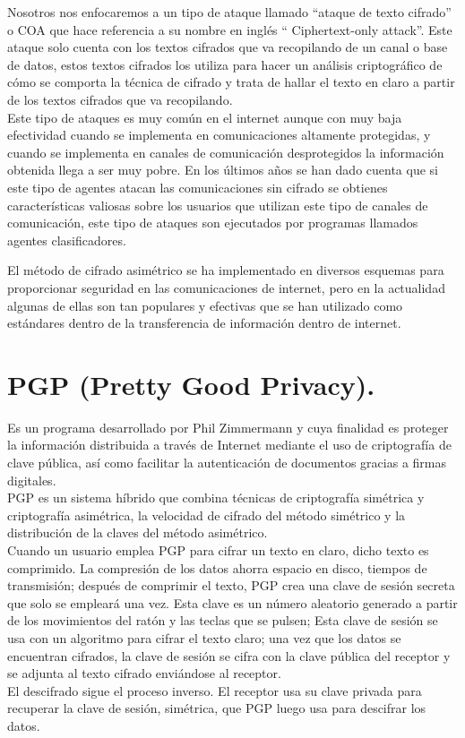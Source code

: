 \documentclass[12pt,oneside,onecolumn,openany]{report}
\begin{document}
Nosotros  nos  enfocaremos  a  un  tipo  de  ataque  llamado “ataque  de  texto  cifrado” o COA  que  hace  referencia  a  su  nombre  en  inglés “
Ciphertext-only  attack”\cite{Ciphertextonly}.  Este ataque  solo  cuenta  con  los  textos  cifrados  que  va  recopilando  de  un  canal  o  base  de 
datos,  estos  textos  cifrados  los  utiliza  para  hacer  un  análisis  criptográfico  de  cómo  se comporta la técnica de cifrado  y trata de hallar el texto en claro a partir de los textos cifrados que va recopilando. 
\\
Este  tipo  de  ataques  es  muy  común  en  el  internet  aunque  con  muy  baja  efectividad cuando   se   implementa   en   comunicaciones   altamente   protegidas,   y   cuando   se 
implementa en canales de comunicación desprotegidos  la  información obtenida  llega  a ser  muy  pobre.  En  los  últimos  años  se  han  dado  cuenta  que  si   este  tipo  de 
agentes   atacan las  comunicaciones  sin  cifrado se  obtienes  características  valiosas  sobre  los usuarios  que  utilizan  este  tipo  de  canales  de  comunicación,  este  tipo  de  ataques  son 
ejecutados por programas llamados agentes clasificadores.

El método de cifrado asimétrico se ha implementado en diversos esquemas para proporcionar seguridad en las comunicaciones de internet, pero en la actualidad algunas de ellas son tan populares y efectivas que se han utilizado como estándares dentro de la transferencia de información dentro de internet.\\
\section{PGP (Pretty Good Privacy).}
Es un programa desarrollado por Phil Zimmermann y cuya finalidad es proteger la información distribuida a través de Internet mediante el uso de criptografía de clave pública, así como facilitar la autenticación de documentos gracias a firmas digitales.\\
PGP es un sistema híbrido que combina técnicas de criptografía simétrica y criptografía asimétrica, la velocidad de cifrado del método simétrico y la distribución de la claves del método asimétrico.\\
Cuando un usuario emplea PGP para cifrar un texto en claro, dicho texto es comprimido. La compresión de los datos ahorra espacio en disco, tiempos de transmisión; después de comprimir el texto, PGP crea una clave de sesión secreta que solo se empleará una vez. Esta clave es un número aleatorio generado a partir de los movimientos del ratón y las teclas que se pulsen; Esta clave de sesión se usa con un algoritmo para cifrar el texto claro; una vez que los datos se encuentran cifrados, la clave de sesión se cifra con la clave pública del receptor y se adjunta al texto cifrado enviándose al receptor.\\
El descifrado sigue el proceso inverso. El receptor usa su clave privada para recuperar la clave de sesión, simétrica, que PGP luego usa para descifrar los datos.\cite{pgp}\\
\end{document}
